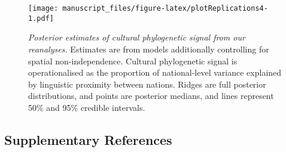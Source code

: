 \documentclass[english,man,floatsintext]{apa6}
\begin{document}
\newpage



\begin{figure}
\centering
\texttt{[image: manuscript\_files/figure-latex/plotReplications4-1.pdf]}
\caption{\label{fig:plotReplications4}\emph{Posterior estimates of cultural phylogenetic signal from our reanalyses.} Estimates are from models additionally controlling for spatial non-independence. Cultural phylogenetic signal is operationalised as the proportion of national-level variance explained by linguistic proximity between nations. Ridges are full posterior distributions, and points are posterior medians, and lines represent 50\% and 95\% credible intervals.}
\end{figure}

\newpage

\hypertarget{supplementary-references}{%
\subsection{Supplementary References}\label{supplementary-references}}
\end{document}
